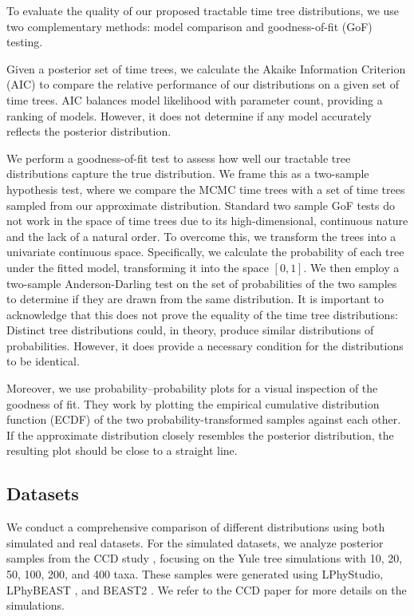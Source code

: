 \documentclass[10pt,letterpaper]{article}
\begin{document}
To evaluate the quality of our proposed tractable time tree distributions, we use two complementary methods: model comparison and goodness-of-fit (GoF) testing.

Given a posterior set of time trees, we calculate the Akaike Information Criterion (AIC) to compare the relative performance of our distributions on a given set of time trees. AIC balances model likelihood with parameter count, providing a ranking of models. However, it does not determine if any model accurately reflects the posterior distribution.

We perform a goodness-of-fit test to assess how well our tractable tree distributions capture the true distribution. We frame this as a two-sample hypothesis test, where we compare the MCMC time trees with a set of time trees sampled from our approximate distribution. Standard two sample GoF tests do not work in the space of time trees due to its high-dimensional, continuous nature and the lack of a natural order. To overcome this, we transform the trees into a univariate continuous space. Specifically, we calculate the probability of each tree under the fitted model, transforming it into the space $[0, 1]$. We then employ a two-sample Anderson-Darling test on the set of probabilities of the two samples to determine if they are drawn from the same distribution. It is important to acknowledge that this does not prove the equality of the time tree distributions: Distinct tree distributions could, in theory, produce similar distributions of probabilities. However, it does provide a necessary condition for the distributions to be identical.

Moreover, we use probability–probability plots for a visual inspection of the goodness of fit. They work by plotting the empirical cumulative distribution function (ECDF) of the two probability-transformed samples against each other. If the approximate distribution closely resembles the posterior distribution, the resulting plot should be close to a straight line.

\subsection*{Datasets}

We conduct a comprehensive comparison of different distributions using both simulated and real datasets. For the simulated datasets, we analyze posterior samples from the CCD study \cite{ccddata}, focusing on the Yule tree simulations with 10, 20, 50, 100, 200, and 400 taxa. These samples were generated using LPhyStudio, LPhyBEAST \cite{linguaphylo}, and BEAST2 \cite{beast2}. We refer to the CCD paper \cite{ccd} for more details on the simulations.
\end{document}
